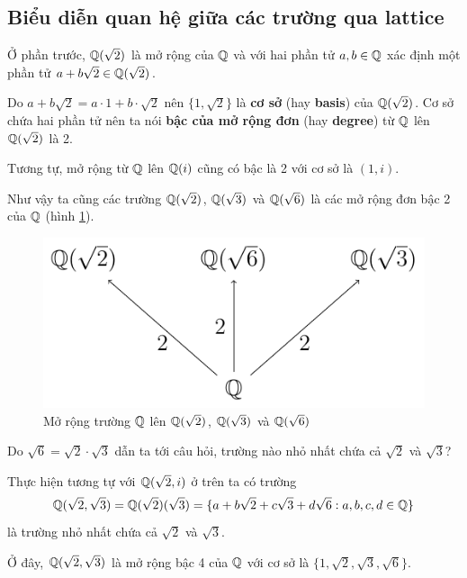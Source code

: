 \subsection*{Biểu diễn quan hệ giữa các trường qua lattice}

Ở phần trước, $\mathbb{Q}(\sqrt{2})$ là mở rộng của $\mathbb{Q}$ và với hai phần tử $a, b \in \mathbb{Q}$ xác định một phần tử $a + b \sqrt{2} \in \mathbb{Q}(\sqrt{2})$.

Do $a + b \sqrt{2} = a \cdot 1 + b \cdot \sqrt{2}$ nên $\{ 1, \sqrt{2} \}$ là \textbf{cơ sở} (hay \textbf{basis}) của $\mathbb{Q}(\sqrt{2})$. Cơ sở chứa hai phần tử nên ta nói \textbf{bậc của mở rộng đơn} (hay \textbf{degree}) từ $\mathbb{Q}$ lên $\mathbb{Q}(\sqrt{2})$ là 2.

Tương tự, mở rộng từ $\mathbb{Q}$ lên $\mathbb{Q}(i)$ cũng có bậc là 2 với cơ sở là $(1, i)$.

Như vậy ta cũng các trường $\mathbb{Q}(\sqrt{2})$, $\mathbb{Q}(\sqrt{3})$ và $\mathbb{Q}(\sqrt{6})$ là các mở rộng đơn bậc 2 của $\mathbb{Q}$ (hình \ref{extension_field:1}).

\begin{figure}[htb]
    \centering
    \includegraphics[page=1]{extension_field.pdf}
    \caption{Mở rộng trường $\mathbb{Q}$ lên $\mathbb{Q}(\sqrt{2})$, $\mathbb{Q}(\sqrt{3})$ và $\mathbb{Q}(\sqrt{6})$}
    \label{extension_field:1}
\end{figure}

Do $\sqrt{6} = \sqrt{2} \cdot \sqrt{3}$ dẫn ta tới câu hỏi, trường nào nhỏ nhất chứa cả $\sqrt{2}$ và $\sqrt{3}$?

Thực hiện tương tự với $\mathbb{Q}(\sqrt{2}, i)$ ở trên ta có trường
\begin{equation*}
    \mathbb{Q}(\sqrt{2}, \sqrt{3}) = \mathbb{Q}(\sqrt{2})(\sqrt{3}) = \{ a + b \sqrt{2} + c \sqrt{3} + d \sqrt{6} : a, b, c, d \in \mathbb{Q} \}
\end{equation*}
là trường nhỏ nhất chứa cả $\sqrt{2}$ và $\sqrt{3}$.

Ở đây, $\mathbb{Q}(\sqrt{2}, \sqrt{3})$ là mở rộng bậc 4 của $\mathbb{Q}$ với cơ sở là $\{ 1, \sqrt{2}, \sqrt{3}, \sqrt{6} \}$.

